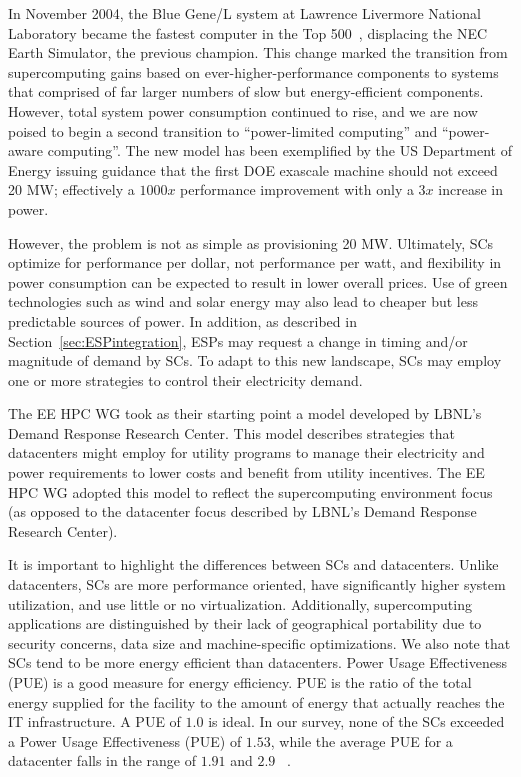 In November 2004, the Blue Gene/L system at Lawrence Livermore National Laboratory
became the fastest computer in the Top 500~\cite{Top500}, displacing the NEC Earth Simulator,
the previous champion. This change marked the transition from supercomputing gains based
on ever-higher-performance components to systems that comprised of far larger numbers of 
slow but energy-efficient components. However, total system power consumption continued to rise,
and we are now poised to begin a second transition to ``power-limited computing'' and ``power-aware computing''. The new
model has been exemplified by the US Department of Energy issuing guidance that the first
DOE exascale machine should not exceed 20 MW; effectively a $1000x$ performance improvement
with only a $3x$ increase in power. 

However, the problem is not as simple as provisioning 20 MW. Ultimately, SCs optimize for
performance per dollar, not performance per watt, and flexibility in power consumption
can be expected to result in lower overall prices. Use of green technologies such as
wind and solar energy may also lead to cheaper but less predictable sources of power.
In addition, as described in Section~\ref{sec:ESPintegration}, ESPs may request a change in timing and/or magnitude of demand by SCs. To adapt to this new landscape, SCs may employ one or more strategies to control their electricity demand. 

The EE HPC WG took as their starting point a
model developed by LBNL's Demand Response Research
Center. This model describes strategies that datacenters might employ for utility programs to manage their electricity and
power requirements to lower costs and benefit from utility
incentives. The EE HPC WG adopted this model %
to reflect the supercomputing environment
focus (as opposed to %
the datacenter focus described by LBNL's Demand
Response Research Center).

It is important to highlight the differences between SCs and datacenters. Unlike datacenters, SCs are more performance oriented, have significantly higher system utilization, and use little or no virtualization. 
Additionally, supercomputing
applications are distinguished by their lack of geographical
portability due to security concerns, data size and machine-specific
optimizations.  
%
We also note that SCs tend to be more
energy efficient than datacenters. Power Usage Effectiveness (PUE) is a good measure for energy efficiency. PUE is the ratio of the total energy supplied for the facility to the amount of energy that actually reaches the IT infrastructure. A PUE of $1.0$ is ideal. In our survey, none of the SCs exceeded a Power Usage Effectiveness (PUE) of $1.53$, while the average PUE for a datacenter falls in the range of $1.91$ and $2.9$ ~\cite{Niccolai}.

